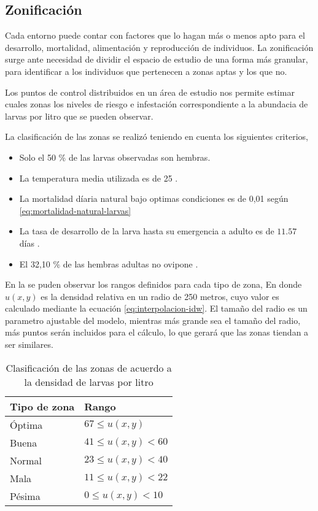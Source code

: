 \subsection{Zonificación}
\label{subsec:cap4-zonificacion}
Cada entorno puede contar con factores que lo hagan más o menos apto para el desarrollo,
mortalidad, alimentación y reproducción de individuos. La zonificación surge ante necesidad de
dividir el espacio de estudio de una forma más granular, para identificar a los individuos que
pertenecen a zonas aptas y los que no.

Los puntos de control distribuidos en un área de estudio nos permite estimar cuales zonas los
niveles de riesgo e infestación correspondiente a la abundacia de larvas por litro que se pueden
observar.

La clasificación de las zonas se realizó teniendo en cuenta los siguientes criterios,
\begin{itemize}
    \item Solo el 50 \% de las larvas observadas son hembras.
    \item La temperatura media utilizada es de 25 \textcelsius.
    \item La mortalidad díaria natural bajo optimas condiciones es de 0,01 según
    \eqref{eq:mortalidad-natural-larvas}
    \item La tasa de desarrollo de la larva hasta su emergencia a adulto es de $11.57$ días
    \citep{rueda1990temperature}.
    \item El 32,10 \% de las hembras adultas no ovipone \citep{osoriopontificia}.
\end{itemize}

En la  se puden observar los rangos definidos para cada tipo de zona, En
donde $u(x,y)$ es la densidad relativa en un radio de 250 metros, cuyo valor es calculado mediante
la ecuación \eqref{eq:interpolacion-idw}. El tamaño del radio es un parametro ajustable del
modelo, mientras más grande sea el tamaño del radio, más puntos serán incluidos para el cálculo,
lo que gerará que las zonas tiendan a ser similares.

\begin{table}
\centering
    \label{tab:puntaje-zona}
    \begin{tabular}{p{3cm} p{5cm}}
        Tipo de zona & Rango \\
        \hline
        Óptima & $67 \leq u(x,y)$ \\
        Buena  & $41 \leq u(x,y) < 60 $  \\
        Normal & $23 \leq u(x,y) < 40$\\
        Mala   & $11 \leq u(x,y) < 22$\\
        Pésima &  $0 \leq u(x,y) < 10 $ \\
    \end{tabular}
    \caption{Clasificación de las zonas de acuerdo a la densidad de larvas por litro}
\end{table}

